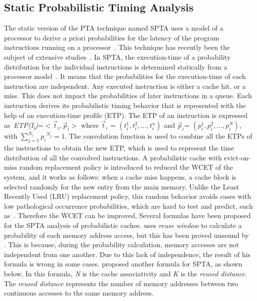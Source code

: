 \subsection{Static Probabilistic Timing Analysis}
\label{spta} The static version of the PTA technique named SPTA uses a model of a processor to derive a priori probabilities for the latency of the program instructions running on a processor~\cite{cucu2012measurement}. This technique has recently been the subject of extensive studies~\cite{Cazorla:2013:PPA:2465787.2465796}. In SPTA, the execution-time of a probability distribution for the individual instructions is determined statically from a processor model~\cite{cucu2012measurement}. It means that the probabilities for the execution-time of each instruction are independent.  Any executed instruction is either a cache hit, or a miss. This does not impact the probabilities of later instructions in a queue. Each instruction derives its probabilistic timing behavior that is represented with the help of an execution-time profile (ETP). The ETP of an instruction is expressed as~\textit{ETP(I\textsubscript{i})}=$<\vec{t}_i, \vec{p}_i>$
where $\vec{t}_i$ = $(t^1_i, t^2_i,...,t^n_i )$ and $\vec{p}_i$= $(p^1_i, p^2_i,...,p^N_i)$, with $\sum^{N{_i}}_{j=1}{p_i}^{N_j} = 1$. The convolution function is used to combine all the ETPs of the instructions to obtain the new ETP, which is used to represent the time distribution of all the convolved instructions. A probabilistic cache with evict-on-miss random replacement policy is introduced
to reduced the WCET of the system, and it works as follows: when a cache miss
happens, a cache block is selected randomly for the new entry from the main
memory. Unlike the Least Recently Used (LRU) replacement policy, this random
behavior avoids cases with low pathological occurrence probabilities, which are
hard to test and predict, such as~\cite{Cazorla:2013:PPA:2465787.2465796}. Therefore the
WCET can be improved.
Several formulas have been proposed for the SPTA analysis of probabilistic caches.
\cite{zhou:spta} uses \textit{reuse window} to calculate a probability of each
memory address access, but this has been proved unsound by \cite{Cazorla:2013:PPA:2465787.2465796}. This is because, during the probability calculation, memory
accesses are not independent from one another. Due to this lack of independence,
the result of his formula is wrong in some cases. \cite{Cazorla:2013:PPA:2465787.2465796} proposed another formula for SPTA, as shown
below. In this formula, \textit{N} is the cache associativity and \textit{K} is the
\textit{reused distance}. The \textit{reused distance} represents the number of memory
addresses between two continuous accesses to the same memory address.


